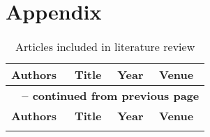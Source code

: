\onecolumn
\section{Appendix}


\begingroup
\renewcommand{\arraystretch}{1.3}

\begin{longtable}{@{} | p{} | p{} | p{} | p{} | @{}}
\caption{Articles included in literature review} \\
\hline \textbf{Authors} & \textbf{Title} & \textbf{Year} & \textbf{Venue} \\ \hline
\endfirsthead

\multicolumn{4}{c}{{\bfseries \tablename\ \thetable{} -- continued from previous page}} \\
\hline \textbf{Authors} & \textbf{Title} & \textbf{Year} & \textbf{Venue} \\ \hline
\endhead

\endlastfoot


\end{longtable}
